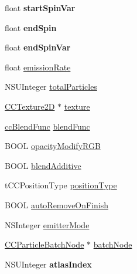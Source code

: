 \begin{DoxyCompactItemize}
\item 
\hypertarget{interface_c_c_particle_system_af69eea924b332aa0796dfdbab62dca67}{float {\bfseries start\-Spin\-Var}}\label{interface_c_c_particle_system_af69eea924b332aa0796dfdbab62dca67}

\item 
\hypertarget{interface_c_c_particle_system_ad32c08649695e3f6797ad4e07e7bf37e}{float {\bfseries end\-Spin}}\label{interface_c_c_particle_system_ad32c08649695e3f6797ad4e07e7bf37e}

\item 
\hypertarget{interface_c_c_particle_system_a7876311b6e129159d7399ef243a5669b}{float {\bfseries end\-Spin\-Var}}\label{interface_c_c_particle_system_a7876311b6e129159d7399ef243a5669b}

\item 
float \hyperlink{interface_c_c_particle_system_a35e7bf6e8ed7764949dff7268c809bb1}{emission\-Rate}
\item 
N\-S\-U\-Integer \hyperlink{interface_c_c_particle_system_a2f888085862e36db54c9e85a43375748}{total\-Particles}
\item 
\hyperlink{class_c_c_texture2_d}{C\-C\-Texture2\-D} $\ast$ \hyperlink{interface_c_c_particle_system_a36f3e14e4bef6d369e9a70808027a4f4}{texture}
\item 
\hyperlink{cc_types_8h_a8c19c6f67219ecc0a6e4740cc046008d}{cc\-Blend\-Func} \hyperlink{interface_c_c_particle_system_a8393dacf0b2edf14e0e0561f34250d9d}{blend\-Func}
\item 
B\-O\-O\-L \hyperlink{interface_c_c_particle_system_adbacc119b077190034693f4cadf270b6}{opacity\-Modify\-R\-G\-B}
\item 
B\-O\-O\-L \hyperlink{interface_c_c_particle_system_a70ae08e234d8bd069f2d1d37723fde25}{blend\-Additive}
\item 
t\-C\-C\-Position\-Type \hyperlink{interface_c_c_particle_system_afe4cea3adf77adad04de3a511da2e996}{position\-Type}
\item 
B\-O\-O\-L \hyperlink{interface_c_c_particle_system_a279831316b8454baf2922397eb6315c6}{auto\-Remove\-On\-Finish}
\item 
N\-S\-Integer \hyperlink{interface_c_c_particle_system_a9fc3e2fcc5581ee70203a1e0a3b38177}{emitter\-Mode}
\item 
\hyperlink{interface_c_c_particle_batch_node}{C\-C\-Particle\-Batch\-Node} $\ast$ \hyperlink{interface_c_c_particle_system_a01368df2d1792835d3c174dd3aba36be}{batch\-Node}
\item 
\hypertarget{interface_c_c_particle_system_a2638667740309e1a3dcbfb1203c23238}{N\-S\-U\-Integer {\bfseries atlas\-Index}}\label{interface_c_c_particle_system_a2638667740309e1a3dcbfb1203c23238}

\end{DoxyCompactItemize}


